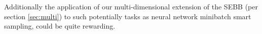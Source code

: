 Additionally the application of our multi-dimensional extension of the SEBB (per section \ref{sec:multi}) to such potentially tasks as neural network minibatch smart sampling, could be quite rewarding.








